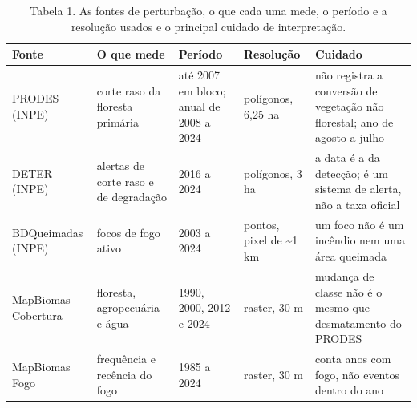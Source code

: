 \begin{table}
\caption{Tabela 1. As fontes de perturbação, o que cada uma mede, o período e a resolução usados e o principal cuidado de interpretação.}
\label{tab:04_perturbacao::fontes}
\begin{tabular}{lllll}
\toprule
Fonte & O que mede & Período & Resolução & Cuidado \\
\midrule
PRODES (INPE) & corte raso da floresta primária & até 2007 em bloco; anual de 2008 a 2024 & polígonos, 6,25 ha & não registra a conversão de vegetação não florestal; ano de agosto a julho \\
DETER (INPE) & alertas de corte raso e de degradação & 2016 a 2024 & polígonos, 3 ha & a data é a da detecção; é um sistema de alerta, não a taxa oficial \\
BDQueimadas (INPE) & focos de fogo ativo & 2003 a 2024 & pontos, pixel de \textasciitilde 1 km & um foco não é um incêndio nem uma área queimada \\
MapBiomas Cobertura & floresta, agropecuária e água & 1990, 2000, 2012 e 2024 & raster, 30 m & mudança de classe não é o mesmo que desmatamento do PRODES \\
MapBiomas Fogo & frequência e recência do fogo & 1985 a 2024 & raster, 30 m & conta anos com fogo, não eventos dentro do ano \\
\bottomrule
\end{tabular}
\end{table}
